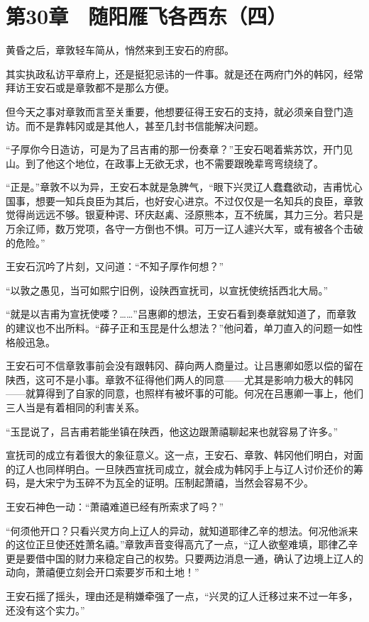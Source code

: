 \section{第30章　随阳雁飞各西东（四）}

黄昏之后，章敦轻车简从，悄然来到王安石的府邸。

其实执政私访平章府上，还是挺犯忌讳的一件事。就是还在两府门外的韩冈，经常拜访王安石或是章敦都不是那么方便。

但今天之事对章敦而言至关重要，他想要征得王安石的支持，就必须亲自登门造访。而不是靠韩冈或是其他人，甚至几封书信能解决问题。

“子厚你今日造访，可是为了吕吉甫的那一份奏章？”王安石喝着紫苏饮，开门见山。到了他这个地位，在政事上无欲无求，也不需要跟晚辈弯弯绕绕了。

“正是。”章敦不以为异，王安石本就是急脾气，“眼下兴灵辽人蠢蠢欲动，吉甫忧心国事，想要一知兵良臣为其后，也好安心进京。不过仅仅是一名知兵的良臣，章敦觉得尚远远不够。银夏种谔、环庆赵禼、泾原熊本，互不统属，其力三分。若只是万余辽师，数万党项，各守一方倒也不惧。可万一辽人遽兴大军，或有被各个击破的危险。”

王安石沉吟了片刻，又问道：“不知子厚作何想？”

“以敦之愚见，当可如熙宁旧例，设陕西宣抚司，以宣抚使统括西北大局。”

“就是以吉甫为宣抚使喽？……”吕惠卿的想法，王安石看到奏章就知道了，而章敦的建议也不出所料。“薛子正和玉昆是什么想法？”他问着，单刀直入的问题一如性格般迅急。

王安石可不信章敦事前会没有跟韩冈、薛向两人商量过。让吕惠卿如愿以偿的留在陕西，这可不是小事。章敦不征得他们两人的同意——尤其是影响力极大的韩冈——就算得到了自家的同意，也照样有被坏事的可能。何况在吕惠卿一事上，他们三人当是有着相同的利害关系。

“玉昆说了，吕吉甫若能坐镇在陕西，他这边跟萧禧聊起来也就容易了许多。”

宣抚司的成立有着很大的象征意义。这一点，王安石、章敦、韩冈他们明白，对面的辽人也同样明白。一旦陕西宣抚司成立，就会成为韩冈手上与辽人讨价还价的筹码，是大宋宁为玉碎不为瓦全的证明。压制起萧禧，当然会容易不少。

王安石神色一动：“萧禧难道已经有所索求了吗？”

“何须他开口？只看兴灵方向上辽人的异动，就知道耶律乙辛的想法。何况他派来的这位正旦使还姓萧名禧。”章敦声音变得高亢了一点，“辽人欲壑难填，耶律乙辛更是要借中国的财力来稳定自己的权势。只要两边消息一通，确认了边境上辽人的动向，萧禧便立刻会开口索要岁币和土地！”

王安石摇了摇头，理由还是稍嫌牵强了一点，“兴灵的辽人迁移过来不过一年多，还没有这个实力。”

